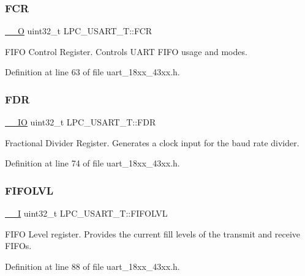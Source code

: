 \subsubsection{\texorpdfstring{F\+CR}{FCR}}
{\footnotesize\ttfamily \hyperlink{core__sc300_8h_a7e25d9380f9ef903923964322e71f2f6}{\+\_\+\+\_\+O} uint32\+\_\+t L\+P\+C\+\_\+\+U\+S\+A\+R\+T\+\_\+\+T\+::\+F\+CR}

F\+I\+FO Control Register. Controls U\+A\+RT F\+I\+FO usage and modes. 

Definition at line 63 of file uart\+\_\+18xx\+\_\+43xx.\+h.

\mbox{\label{struct_l_p_c___u_s_a_r_t___t_ae35ac03aeeafd5a54f2c2c675b6dca4f}} 
\subsubsection{\texorpdfstring{F\+DR}{FDR}}
{\footnotesize\ttfamily \hyperlink{core__sc300_8h_aec43007d9998a0a0e01faede4133d6be}{\+\_\+\+\_\+\+IO} uint32\+\_\+t L\+P\+C\+\_\+\+U\+S\+A\+R\+T\+\_\+\+T\+::\+F\+DR}

Fractional Divider Register. Generates a clock input for the baud rate divider. 

Definition at line 74 of file uart\+\_\+18xx\+\_\+43xx.\+h.

\mbox{\label{struct_l_p_c___u_s_a_r_t___t_a1e5a80261f84a375eda3b575bea8074a}} 
\subsubsection{\texorpdfstring{F\+I\+F\+O\+L\+VL}{FIFOLVL}}
{\footnotesize\ttfamily \hyperlink{core__sc300_8h_af63697ed9952cc71e1225efe205f6cd3}{\+\_\+\+\_\+I} uint32\+\_\+t L\+P\+C\+\_\+\+U\+S\+A\+R\+T\+\_\+\+T\+::\+F\+I\+F\+O\+L\+VL}

F\+I\+FO Level register. Provides the current fill levels of the transmit and receive F\+I\+F\+Os. 

Definition at line 88 of file uart\+\_\+18xx\+\_\+43xx.\+h.

